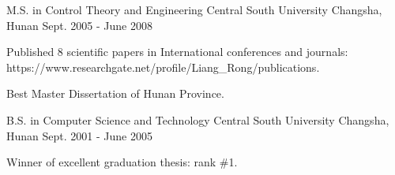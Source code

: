 \begin{cventries}
  \cventry
    {M.S. in Control Theory and Engineering}
    {Central South University}
    {Changsha, Hunan}
    {Sept. 2005 - June 2008}
    {
      \begin{cvitems}
        \item {Published 8 scientific papers in International conferences and journals: https://www.researchgate.net/profile/Liang\_Rong/publications.}
        \item{Best Master Dissertation of Hunan Province.}
      \end{cvitems}
    }
    
  \cventry
    {B.S. in Computer Science and Technology}
    {Central South University}
    {Changsha, Hunan}
    {Sept. 2001 - June 2005}
    {
      \begin{cvitems}
        \item {Winner of excellent graduation thesis: rank \#1.}
      \end{cvitems}
    }
\end{cventries}
